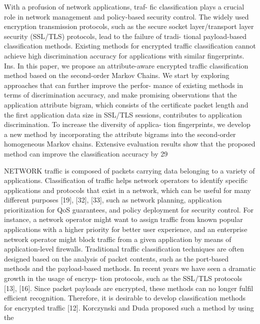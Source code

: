 \documentclass[10pt,journal,compsoc]{IEEEtran}
\begin{document}
\cite{Shen2017}
With a profusion of network applications, traf-
fic classification plays a crucial role in network management and policy-based security control. The widely used encryption transmission protocols, such as the secure socket layer/transport layer security (SSL/TLS) protocols, lead to the failure of tradi- tional payload-based classification methods. Existing methods for encrypted traffic classification cannot achieve high discrimination accuracy for applications with similar fingerprints. Ins. In this paper, we propose an attribute-aware encrypted traffic classification method based on the second-order Markov Chains. We start by exploring approaches that can further improve the perfor- mance of existing methods in terms of discrimination accuracy, and make promising observations that the application attribute bigram, which consists of the certificate packet length and the first application data size in SSL/TLS sessions, contributes to application discrimination. To increase the diversity of applica- tion fingerprints, we develop a new method by incorporating the attribute bigrams into the second-order homogeneous Markov chains. Extensive evaluation results show that the proposed method can improve the classification accuracy by 29%

NETWORK traffic is composed of packets carrying data belonging to a variety of applications. Classification of
traffic helps network operators to identify specific applications and protocols that exist in a network, which can be useful for many different purposes [19], [32], [33], such as network planning, application prioritization for QoS guarantees, and
policy deployment for security control. For instance, a network operator might want to assign traffic from known popular applications with a higher priority for better user experience, and an enterprise network operator might block traffic from a given application by means of application-level firewalls. Traditional traffic classification techniques are often
designed based on the analysis of packet contents, such as the port-based methods and the payload-based methods. In recent years we have seen a dramatic growth in the usage of encryp- tion protocols, such as the SSL/TLS protocols [13], [16]. Since packet payloads are encrypted, these methods can no longer fulfil efficient recognition. Therefore, it is desirable to develop classification methods for encrypted traffic [12]. Korczynski and Duda proposed such a method by using the
\end{document}
